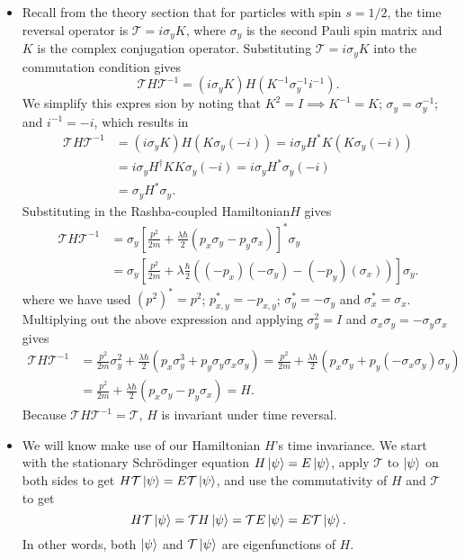 \documentclass[11pt, a4paper]{article}
\newcommand{\Schro}{Schr\"{o}dinger\xspace}
\newcommand{\Ham}{Hamiltonian\xspace}
\newcommand{\T}{\mathcal{T}}  %
\begin{document}
\begin{itemize}
	\item Recall from the theory section that for particles with spin $ s = 1/2 $, the time reversal operator is $ \T = i \sigma_{y} K $, where $ \sigma_{y} $ is the second Pauli spin matrix and $ K $ is the complex conjugation operator. Substituting $ \T = i \sigma_{y} K $ into the commutation condition gives
	\begin{equation*}
		\T H \T^{-1} = (i\sigma_{y}K)H(K^{-1}\sigma_{y}^{-1}i^{-1}).
	\end{equation*}
	We simplify this expres sion by noting that $ K^{2} = I \implies K^{-1} = K$;  $ \sigma_{y} = \sigma_{y}^{-1} $; and $ i^{-1} = -i $, which results in
	\begin{align*}
		\T H \T^{-1} &= (i\sigma_{y}K)H(K\sigma_{y}(-i)) = i \sigma_{y} H^{*} K (K\sigma_{y}(-i)) \\
		&= i \sigma_{y} H^{\dagger} KK \sigma_{y}(-i) = i \sigma_{y}H^{*}\sigma_{y}(-i) \\
		&= \sigma_{y}H^{*} \sigma_{y}.
	\end{align*} 
	Substituting in the Rashba-coupled \Ham $ H $ gives
	\begin{align*}
		\T H\T^{-1} &= \sigma_{y} \left[\frac{p^{2}}{2m} + \frac{\lambda\hbar}{2} (p_{x}\sigma_{y} - p_{y}\sigma_{x})\right]^{*}\sigma_{y} \\
		& = \sigma_{y}\left[\frac{p^{2}}{2m} + \lambda \frac{\hbar}{2}\left((-p_{x})(-\sigma_{y}) - (-p_{y})(\sigma_{x}) \right)\right]\sigma_{y}.
	\end{align*}
	where we have used $ (p^{2})^{*} = p^{2} $; $ p_{x,y}^{*} = -p_{x,y} $; $ \sigma_{y}^{*} = -\sigma_{y} $ and $ \sigma_{x}^{*} = \sigma_{x} $. Multiplying out the above expression and applying $ \sigma_{y}^{2} = I $ and $ \sigma_{x}\sigma_{y} = -\sigma_{y}\sigma_{x} $ gives
	\begin{align*}
		\T H\T^{-1} & = \frac{p^{2}}{2m}\sigma_{y}^{2} + \frac{\lambda\hbar}{2}\left(p_{x}\sigma_{y}^{3} + p_{y}\sigma_{y}\sigma_{x}\sigma_{y}\right) = \frac{p^{2}}{2m} + \frac{\lambda\hbar}{2}\left(p_{x}\sigma_{y} + p_{y}(-\sigma_{x}\sigma_{y})\sigma_{y}\right)\\
		&= \frac{p^{2}}{2m} + \frac{\lambda\hbar}{2} \left(p_{x}\sigma_{y} - p_{y}\sigma_{x}\right) = H.
	\end{align*}
	Because $ \T H\T^{-1} = \T$, $ H $ is invariant under time reversal.
	
	\item We will know make use of our Hamiltonian $ H $'s time invariance. We start with the stationary \Schro equation $ H \ket{\psi} = E \ket{\psi} $, apply $ \T $ to $ \ket{\psi} $ on both sides to get  $ H \T\ket{\psi} = E \T\ket{\psi} $, and use the commutativity of $ H $ and $ \T $ to get
	\begin{equation*}
		H \T \ket{\psi} = \T H \ket{\psi} = \T E \ket{\psi} = E \T \ket{\psi}.
	\end{equation*}
	In other words, both $ \ket{\psi} $ and $ \T\ket{\psi} $ are eigenfunctions of $ H $. 
	

\end{itemize}
\end{document}
